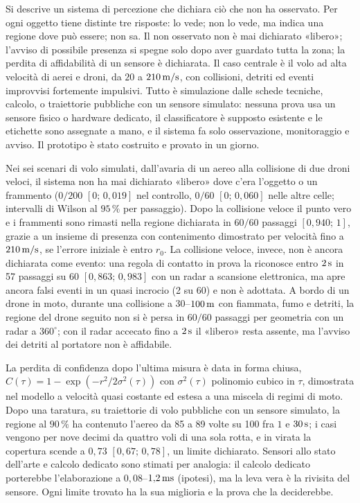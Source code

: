 Si descrive un sistema di percezione che dichiara ciò che non ha osservato. Per ogni oggetto tiene distinte tre risposte: lo vede; non lo vede, ma indica una regione dove può essere; non sa. Il non osservato non è mai dichiarato «libero»; l'avviso di possibile presenza si spegne solo dopo aver guardato tutta la zona; la perdita di affidabilità di un sensore è dichiarata. Il caso centrale è il volo ad alta velocità di aerei e droni, da $20$ a $210\,\mathrm{m/s}$, con collisioni, detriti ed eventi improvvisi fortemente impulsivi. Tutto è simulazione dalle schede tecniche, calcolo, o traiettorie pubbliche con un sensore simulato: nessuna prova usa un sensore fisico o hardware dedicato, il classificatore è supposto esistente e le etichette sono assegnate a mano, e il sistema fa solo osservazione, monitoraggio e avviso. Il prototipo è stato costruito e provato in un giorno.

Nei sei scenari di volo simulati, dall'avaria di un aereo alla collisione di due droni veloci, il sistema non ha mai dichiarato «libero» dove c'era l'oggetto o un frammento ($0/200$ $[0;\,0{,}019]$ nel controllo, $0/60$ $[0;\,0{,}060]$ nelle altre celle; intervalli di Wilson al $95\,\%$ per passaggio). Dopo la collisione veloce il punto vero e i frammenti sono rimasti nella regione dichiarata in $60/60$ passaggi $[0{,}940;\,1]$, grazie a un insieme di presenza con contenimento dimostrato per velocità fino a $210\,\mathrm{m/s}$, se l'errore iniziale è entro $r_0$. La collisione veloce, invece, non è ancora dichiarata come evento: una regola di contatto in prova la riconosce entro $2\,\mathrm{s}$ in 57 passaggi su 60 $[0{,}863;\,0{,}983]$ con un radar a scansione elettronica, ma apre ancora falsi eventi in un quasi incrocio (2 su 60) e non è adottata. A bordo di un drone in moto, durante una collisione a $30$--$100\,\mathrm{m}$ con fiammata, fumo e detriti, la regione del drone seguito non si è persa in $60/60$ passaggi per geometria con un radar a $360^\circ$; con il radar accecato fino a $2\,\mathrm{s}$ il «libero» resta assente, ma l'avviso dei detriti al portatore non è affidabile.

La perdita di confidenza dopo l'ultima misura è data in forma chiusa, $C(\tau)=1-\exp(-r^2/2\sigma^2(\tau))$ con $\sigma^2(\tau)$ polinomio cubico in $\tau$, dimostrata nel modello a velocità quasi costante ed estesa a una miscela di regimi di moto. Dopo una taratura, su traiettorie di volo pubbliche con un sensore simulato, la regione al $90\,\%$ ha contenuto l'aereo da 85 a 89 volte su 100 fra $1$ e $30\,\mathrm{s}$; i casi vengono per nove decimi da quattro voli di una sola rotta, e in virata la copertura scende a $0{,}73$ $[0{,}67;\,0{,}78]$, un limite dichiarato. Sensori allo stato dell'arte e calcolo dedicato sono stimati per analogia: il calcolo dedicato porterebbe l'elaborazione a $0{,}08$--$1{,}2\,\mathrm{ms}$ (ipotesi), ma la leva vera è la rivisita del sensore. Ogni limite trovato ha la sua miglioria e la prova che la deciderebbe.


